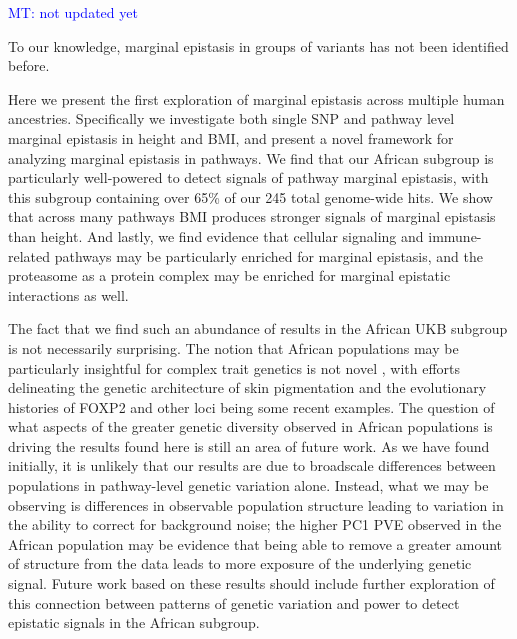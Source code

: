 \documentclass[12pt,a4paper]{article}
\begin{document}
\textcolor{blue}{MT: not updated yet}

To our knowledge, marginal epistasis in groups of variants has not been identified before. 

Here we present the first exploration of marginal epistasis across multiple human ancestries. Specifically we investigate both single SNP and pathway level marginal epistasis in height and BMI, and present a novel framework for analyzing marginal epistasis in pathways. We find that our African subgroup is particularly well-powered to detect signals of pathway marginal epistasis, with this subgroup containing over 65\% of our 245 total genome-wide hits. We show that across many pathways BMI produces stronger signals of marginal epistasis than height. And lastly, we find evidence that cellular signaling and immune-related pathways may be particularly enriched for marginal epistasis, and the proteasome as a protein complex may be enriched for marginal epistatic interactions as well. 

The fact that we find such an abundance of results in the African UKB subgroup is not necessarily surprising. The notion that African populations may be particularly insightful for complex trait genetics is not novel \citep{Rotimi2017,Choudhury2018,Martin2018,Bentley2020}, with efforts delineating the genetic architecture of skin pigmentation \citep{Martin2017b,Crawford2017b} and the evolutionary histories of FOXP2 and other loci \citep{Atkinson2018,Sugden2018} being some recent examples. The question of what aspects of the greater genetic diversity observed in African populations is driving the results found here is still an area of future work. As we have found initially, it is unlikely that our results are due to broadscale differences between populations in pathway-level genetic variation alone. Instead, what we may be observing is differences in observable population structure leading to variation in the ability to correct for background noise; the higher PC1 PVE observed in the African population may be evidence that being able to remove a greater amount of structure from the data leads to more exposure of the underlying genetic signal. Future work based on these results should include further exploration of this connection between patterns of genetic variation and power to detect epistatic signals in the African subgroup.  
\end{document}
